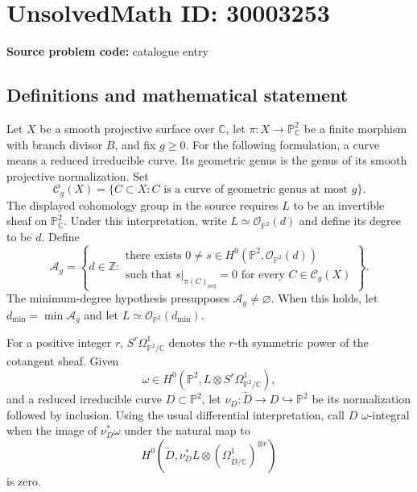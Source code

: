 \documentclass[11pt]{article}
\newcommand{\Z}{\mathbb{Z}}
\newcommand{\C}{\mathbb{C}}
\newcommand{\PP}{\mathbb{P}}
\begin{document}
\section*{UnsolvedMath ID: 30003253}
\textbf{Source problem code:} catalogue entry
\subsection{Definitions and mathematical statement}
Let \(X\) be a smooth projective surface over \(\C\), let \(\pi:X\to\PP^2_{\C}\) be a finite morphism with branch divisor \(B\), and fix \(g\geq0\). For the following formulation, a curve means a reduced irreducible curve. Its geometric genus is the genus of its smooth projective normalization. Set
\[
\mathcal C_g(X)=\{C\subset X:C\text{ is a curve of geometric genus at most }g\}.
\]
The displayed cohomology group in the source requires \(L\) to be an invertible sheaf on \(\PP^2_{\C}\). Under this interpretation, write \(L\simeq\mathcal O_{\PP^2}(d)\) and define its degree to be \(d\). Define
\[
\mathcal A_g=\left\{d\in\Z:\begin{array}{l}\text{there exists }0\ne s\in H^0(\PP^2,\mathcal O_{\PP^2}(d))\\\text{such that }s|_{\pi(C)_{\mathrm{red}}}=0\text{ for every }C\in\mathcal C_g(X)\end{array}\right\}.
\]
The minimum-degree hypothesis presupposes \(\mathcal A_g\ne\varnothing\). When this holds, let \(d_{\min}=\min\mathcal A_g\) and let \(L\simeq\mathcal O_{\PP^2}(d_{\min})\).

For a positive integer \(r\), \(S^r\Omega^1_{\PP^2/\C}\) denotes the \(r\)-th symmetric power of the cotangent sheaf. Given
\[
\omega\in H^0\!\left(\PP^2,L\otimes S^r\Omega^1_{\PP^2/\C}\right),
\]
and a reduced irreducible curve \(D\subset\PP^2\), let \(\nu_D:\widetilde D\to D\hookrightarrow\PP^2\) be its normalization followed by inclusion. Using the usual differential interpretation, call \(D\) \(\omega\)-integral when the image of \(\nu_D^*\omega\) under the natural map to
\[
H^0\!\left(\widetilde D,\nu_D^*L\otimes(\Omega^1_{\widetilde D/\C})^{\otimes r}\right)
\]
is zero.
\end{document}

